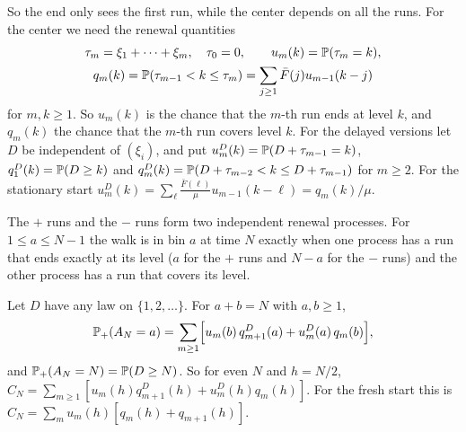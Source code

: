 So the end only sees the first run, while the center depends on all the runs.
For the center we need the renewal quantities
\begin{gather*}
 \tau_m=\xi_1+\dots+\xi_m,\quad\tau_0=0,\qquad u_m(k)=\mathbb{P}(\tau_m=k),\\
 q_m(k)=\mathbb{P}(\tau_{m-1}<k\le\tau_m)=\sum_{j\ge1}\bar F(j)u_{m-1}(k-j)
\end{gather*}
for $m,k\ge1$. So $u_m(k)$ is the chance that the $m$-th run ends at level $k$,
and $q_m(k)$ the chance that the $m$-th run covers level $k$. For the delayed
versions let $D$ be independent of $(\xi_i)$, and put
$u^D_m(k)=\mathbb{P}(D+\tau_{m-1}=k)$, $q^D_1(k)=\mathbb{P}(D\ge k)$ and
$q^D_m(k)=\mathbb{P}(D+\tau_{m-2}<k\le D+\tau_{m-1})$ for $m\ge2$. For the
stationary start
$u^D_m(k)=\sum_\ell\frac{\bar F(\ell)}{\mu}u_{m-1}(k-\ell)=q_m(k)/\mu$.

The $+$ runs and the $-$ runs form two independent renewal processes. For
$1\le a\le N-1$ the walk is in bin $a$ at time $N$ exactly when one process
has a run that ends exactly at its level ($a$ for the $+$ runs and $N-a$ for
the $-$ runs) and the other process has a run that covers its level.

\begin{proposition}\label{prop:tworenewal}
Let $D$ have any law on $\{1,2,\dots\}$. For $a+b=N$ with $a,b\ge1$,
\[
 \mathbb{P}_+(A_N=a)=\sum_{m\ge1}\Bigl[u_m(b)\,q^D_{m+1}(a)+u^D_m(a)\,q_m(b)\Bigr],
\]
and $\mathbb{P}_+(A_N=N)=\mathbb{P}(D\ge N)$. So for even $N$ and $h=N/2$,
$C_N=\sum_{m\ge1}[u_m(h)q^D_{m+1}(h)+u^D_m(h)q_m(h)]$. For the fresh start
this is $C_N=\sum_mu_m(h)[q_m(h)+q_{m+1}(h)]$.
\end{proposition}

